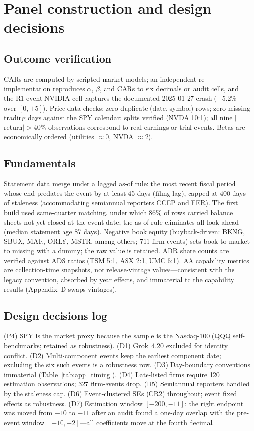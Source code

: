 \documentclass[review,12pt,authoryear]{elsarticle}
\begin{document}
\section{Panel construction and design decisions}\label{app:panel}

\subsection{Outcome verification}
CARs are computed by scripted market models; an independent re-implementation
reproduces $\alpha$, $\beta$, and CARs to six decimals on audit cells, and
the R1-event NVIDIA cell captures the documented 2025-01-27 crash
($-5.2$\% over $[0,+5]$). Price data checks: zero duplicate (date, symbol)
rows; zero missing trading days against the SPY calendar; splits verified
(NVDA 10:1); all nine $|$return$|>40\%$ observations correspond to real
earnings or trial events. Betas are economically ordered (utilities
$\approx 0$, NVDA $\approx 2$).

\subsection{Fundamentals}
Statement data merge under a lagged as-of rule: the most recent fiscal period
whose end predates the event by at least 45 days (filing lag), capped at 400
days of staleness (accommodating semiannual reporters CCEP and FER). The
first build used same-quarter matching, under which 86\% of rows carried
balance sheets not yet closed at the event date; the as-of rule eliminates
all look-ahead (median statement age 87 days). Negative book equity
(buyback-driven: BKNG, SBUX, MAR, ORLY, MSTR, among others; 711 firm-events)
sets book-to-market to missing with a dummy; the raw value is retained.
ADR share counts are verified against ADS ratios (TSM 5:1, ASX 2:1,
UMC 5:1). AA capability metrics are collection-time snapshots, not
release-vintage values---consistent with the legacy convention, absorbed by
year effects, and immaterial to the capability results (Appendix~D swaps
vintages).

\subsection{Design decisions log}
(P4) SPY is the market proxy because the sample is the Nasdaq-100 (QQQ
self-benchmarks; retained as robustness). (D1) Grok~4.20 excluded for
identity conflict. (D2) Multi-component events keep the earliest component
date; excluding the six such events is a robustness row. (D3) Day-boundary
conventions immaterial (Table~\ref{tab:app_timing}). (D4) Late-listed firms
require 120 estimation observations; 327 firm-events drop. (D5) Semiannual
reporters handled by the staleness cap. (D6) Event-clustered SEs (CR2)
throughout; event fixed effects as robustness. (D7) Estimation window $[-200,-11]$; the right endpoint was moved from
$-10$ to $-11$ after an audit found a one-day overlap with the pre-event
window $[-10,-2]$---all coefficients move at the fourth decimal.
\end{document}
